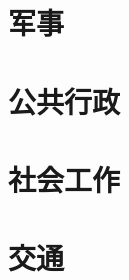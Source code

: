 \documentclass[UTF8]{ApplicationUniverse}
\begin{document}
\chapter{军事}

\chapter{公共行政}

\chapter{社会工作}

\chapter{交通}
\end{document}

